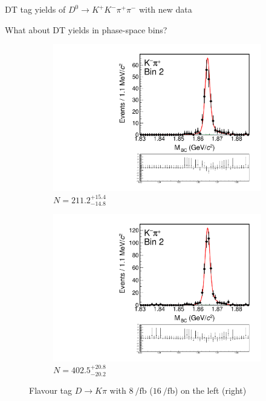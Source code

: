 \documentclass{beamer}
\begin{document}
\begin{frame}{DT tag yields of $D^0\to K^+K^-\pi^+\pi^-$ with new data}
  \begin{center}
    {\large What about DT yields in phase-space bins?}
  \end{center}
  \vspace{0.1cm}
  \begin{figure}
    \centering
    \begin{subfigure}{0.45\textwidth}
      \includegraphics[width = 1.0\textwidth,trim={0 4.9cm 0 0},clip=true]{Plots/DoubleTagYield_DoubleTag_Flavour_KKpipi_vs_Kpi_SignalBinP2_TagBin0_8invfb.pdf}
      \caption{$N = 211.2^{+15.4}_{-14.8}$}
    \end{subfigure}%
    \hspace{1cm}
    \begin{subfigure}{0.45\textwidth}
      \includegraphics[width = 1.0\textwidth,trim={0 4.9cm 0 0},clip=true]{Plots/DoubleTagYield_DoubleTag_Flavour_KKpipi_vs_Kpi_SignalBinP2_TagBin0_16invfb.pdf}
      \caption{$N = 402.5^{+20.8}_{-20.2}$}
    \end{subfigure}
    \caption{Flavour tag $D\to K\pi$ with $\SI{8}{\per\femto\barn}$ ($\SI{16}{\per\femto\barn}$) on the left (right)}
  \end{figure}
\end{frame}
\end{document}
